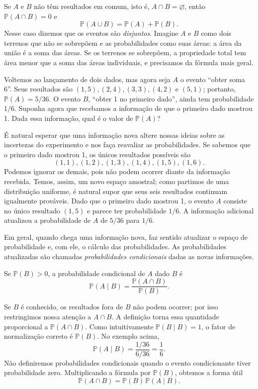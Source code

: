 Se $A$ e $B$ não têm resultados em comum, isto é, $A\cap B=\varnothing$, então $\mathbb{P}(A\cap B)=0$ e
\[
\mathbb{P}(A\cup B)=\mathbb{P}(A)+\mathbb{P}(B).
\]
Nesse caso dizemos que os eventos são \emph{disjuntos}. Imagine $A$ e $B$ como dois terrenos que não se sobrepõem e as probabilidades como suas áreas: a área da união é a soma das áreas. Se os terrenos se sobrepõem, a propriedade total tem área menor que a soma das áreas individuais, e precisamos da fórmula mais geral.

Voltemos ao lançamento de dois dados, mas agora seja $A$ o evento ``obter soma 6''. Seus resultados são $(1,5),(2,4),(3,3),(4,2)$ e $(5,1)$; portanto, $\mathbb{P}(A)=5/36$. O evento $B$, ``obter 1 no primeiro dado'', ainda tem probabilidade $1/6$. Suponha agora que recebamos a informação de que o primeiro dado mostrou 1. Dada essa informação, qual é o valor de $\mathbb{P}(A)$?

É natural esperar que uma informação nova altere nossas ideias sobre as incertezas do experimento e nos faça reavaliar as probabilidades. Se sabemos que o primeiro dado mostrou 1, os únicos resultados possíveis são
\[
(1,1),(1,2),(1,3),(1,4),(1,5),(1,6).
\]
Podemos ignorar os demais, pois não podem ocorrer diante da informação recebida. Temos, assim, um novo espaço amostral; como partimos de uma distribuição uniforme, é natural supor que seus seis resultados continuam igualmente prováveis. Dado que o primeiro dado mostrou 1, o evento $A$ consiste no único resultado $(1,5)$ e parece ter probabilidade $1/6$. A informação adicional atualizou a probabilidade de $A$ de $5/36$ para $1/6$.

Em geral, quando chega uma informação nova, faz sentido atualizar o espaço de probabilidade e, com ele, o cálculo das probabilidades. As probabilidades atualizadas são chamadas \emph{probabilidades condicionais} dadas as novas informações.

\begin{definition}
\label{isaac:def:prob-cond}
Se $\mathbb{P}(B)>0$, a probabilidade condicional de $A$ dado $B$ é
\[
\mathbb{P}(A\mid B)=\frac{\mathbb{P}(A\cap B)}{\mathbb{P}(B)}.
\]
\end{definition}

Se $B$ é conhecido, os resultados fora de $B$ não podem ocorrer; por isso restringimos nossa atenção a $A\cap B$. A definição torna essa quantidade proporcional a $\mathbb{P}(A\cap B)$. Como intuitivamente $\mathbb{P}(B\mid B)=1$, o fator de normalização correto é $\mathbb{P}(B)$. No exemplo acima,
\[
\mathbb{P}(A\mid B)=\frac{1/36}{6/36}=\frac16.
\]
Não definiremos probabilidades condicionais quando o evento condicionante tiver probabilidade zero. Multiplicando a fórmula por $\mathbb{P}(B)$, obtemos a forma útil
\[
\mathbb{P}(A\cap B)=\mathbb{P}(B)\,\mathbb{P}(A\mid B).
\]

